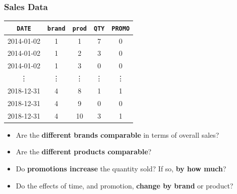 \subsubsection{Sales Data}
\begin{table}[H]
    \centering
    \begin{tabular}{ccccc}
        \toprule
        \texttt{DATE} & \texttt{brand} & \texttt{prod} & \texttt{QTY} & \texttt{PROMO} \\
        \midrule
        2014-01-02    & 1              & 1             & 7            & 0              \\%
        2014-01-02    & 1              & 2             & 3            & 0              \\%
        2014-01-02    & 1              & 3             & 0            & 0              \\%
        \vdots        & \vdots         & \vdots        & \vdots       & \vdots         \\%
        2018-12-31    & 4              & 8             & 1            & 1              \\%
        2018-12-31    & 4              & 9             & 0            & 0              \\%
        2018-12-31    & 4              & 10            & 3            & 1              \\%
        \bottomrule
    \end{tabular}
\end{table}
\begin{itemize}
    \item Are the \textbf{different brands comparable} in terms of overall sales?
    \item Are the \textbf{different products comparable}?
    \item Do \textbf{promotions increase} the quantity sold? If so, \textbf{by how much}?
    \item Do the effects of time, and promotion, \textbf{change by brand} or product?
\end{itemize}
